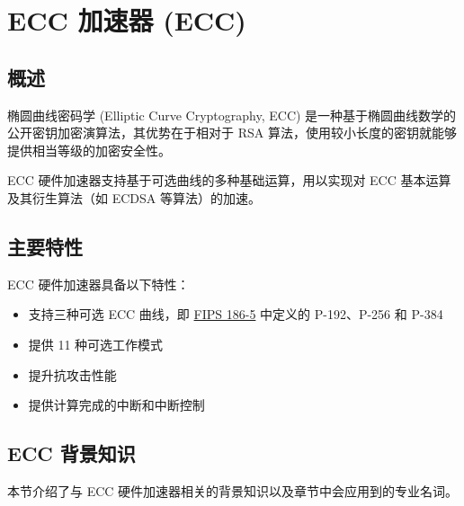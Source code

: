 \documentclass[main\_\_CN.tex]{subfiles}
\begin{document}

\ifglobal
\else
    \listoftodos
    {\let\clearpage\relax \listofdonetodos}
    \tableofcontents
\fi



\hypertarget{ecc}{}
\chapter{ECC 加速器 (ECC)}
\label{mod:ecc}

\section{概述}

椭圆曲线密码学 (Elliptic Curve Cryptography, ECC) 是一种基于椭圆曲线数学的公开密钥加密演算法，其优势在于相对于 RSA 算法，使用较小长度的密钥就能够提供相当等级的加密安全性。

\chipname{} ECC 硬件加速器支持基于可选曲线的多种基础运算，用以实现对 ECC 基本运算及其衍生算法（如 ECDSA 等算法）的加速。

\section{主要特性}

\chipname{} ECC 硬件加速器具备以下特性：

\begin{itemize}
    \item 支持三种可选 ECC 曲线，即 \href{https://nvlpubs.nist.gov/nistpubs/FIPS/NIST.FIPS.186-5.pdf}{FIPS 186-5} 中定义的 P-192、P-256 和 P-384
    \item 提供 11 种可选工作模式
    \item 提升抗攻击性能
    \item 提供计算完成的中断和中断控制
\end{itemize}

\section{ECC 背景知识}

本节介绍了与 ECC 硬件加速器相关的背景知识以及章节中会应用到的专业名词。
\end{document}
